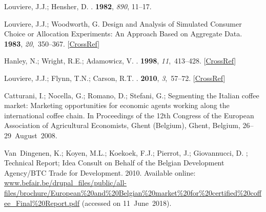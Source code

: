 \documentclass[sustainability,article,accept,moreauthors,pdftex,10pt,a4paper]{Definitions/mdpi}
\theoremstyle{mdpi}
\newcounter{ex}
\newcounter{re}
\theoremstyle{mdpidefinition}
\begin{document}
{\begin{thebibliography}{999}
Louviere, J.J.; Hensher, D.
.
 {\bf 1982}, \emph{890},  11--17.

Louviere, J.J.; Woodworth, G.
\newblock Design and Analysis of Simulated Consumer Choice or Allocation
Experiments: An Approach Based on Aggregate Data.
 {\bf 1983}, {\em 20},~350--367. [\href{http://dx.doi.org/10.2307/3151440}{CrossRef}]

Hanley, N.; Wright, R.E.; Adamowicz, V.
.
 {\bf 1998}, {\em
11},~413--428. [\href{http://dx.doi.org/10.1023/A:1008287310583}{CrossRef}]

Louviere, J.J.; Flynn, T.N.; Carson, R.T.
.
 {\bf 2010}, {\em 3},~57--72. [\href{http://dx.doi.org/10.1016/S1755-5345(13)70014-9}{CrossRef}]

Catturani, I.; Nocella, G.; Romano, D.; Stefani, G.;
\newblock Segmenting the Italian coffee market: Marketing opportunities for
economic agents working along the international coffee chain.
\newblock  In Proceedings of the 12th Congress of the European Association of Agricultural
Economists, Ghent (Belgium), Ghent, Belgium, \mbox{26--29 August 2008}.

Van~Dingenen, K.; Koyen, M.L.; Koekoek, F.J.; Pierrot, J.; Giovannucci, D.
;
\newblock Technical Report; Idea Consult on Behalf of the Belgian Development
Agency/BTC Trade for Development.  2010. Available online:
\newblock
\url{www.befair.be/drupal_files/public/all-files/brochure/European\%20and\%20Belgian\%20market\%20for\%20certified\%20coffee_Final\%20Report.pdf} (accessed on \mbox{11 June 2018}). %


\end{thebibliography}}
\end{document}
